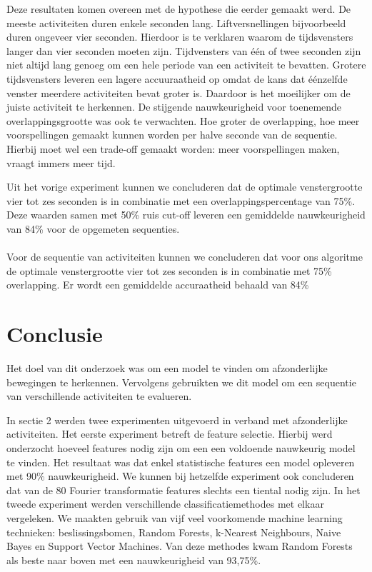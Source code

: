 \documentclass{article}
\begin{document}
Deze resultaten komen overeen met de hypothese die eerder gemaakt werd. De meeste activiteiten duren enkele seconden lang. Liftversnellingen bijvoorbeeld duren ongeveer vier seconden. Hierdoor is te verklaren waarom de tijdsvensters langer dan vier seconden moeten zijn. Tijdvensters van \'e\'en of twee seconden zijn niet altijd lang genoeg om een hele periode van een activiteit te bevatten. Grotere tijdsvensters leveren een lagere accuuraatheid op omdat de kans dat \'e\'enzelfde venster meerdere activiteiten bevat groter is. Daardoor is het moeilijker om de juiste activiteit te herkennen. De stijgende nauwkeurigheid voor toenemende overlappingsgrootte was ook te verwachten. Hoe groter de overlapping, hoe meer voorspellingen gemaakt kunnen worden per halve seconde van de sequentie. Hierbij moet wel een trade-off gemaakt worden: meer voorspellingen maken, vraagt immers meer tijd.

Uit het vorige experiment kunnen we concluderen dat de optimale venstergrootte vier tot zes seconden is in combinatie met een overlappingspercentage van 75\%. Deze waarden samen met 50\% ruis cut-off leveren een gemiddelde nauwkeurigheid van 84\% voor de opgemeten sequenties.
\\~\\
Voor de sequentie van activiteiten kunnen we concluderen dat voor ons algoritme de optimale venstergrootte vier tot zes seconden is in combinatie met 75\% overlapping. Er wordt een gemiddelde accuraatheid behaald van 84\%

	

\section{Conclusie}

Het doel van dit onderzoek was om een model te vinden om afzonderlijke bewegingen te herkennen. Vervolgens gebruikten we dit model om een sequentie van verschillende activiteiten te evalueren.

	In sectie 2 werden twee experimenten uitgevoerd in verband met afzonderlijke activiteiten. Het eerste experiment betreft de feature selectie. Hierbij werd onderzocht hoeveel features nodig zijn om een een voldoende nauwkeurig model te vinden. Het resultaat was dat enkel statistische features een model opleveren met 90\% nauwkeurigheid. We kunnen bij hetzelfde experiment ook concluderen dat van de 80 Fourier transformatie features slechts een tiental nodig zijn.
	In het tweede experiment werden verschillende classificatiemethodes met elkaar vergeleken. We maakten gebruik van vijf veel voorkomende machine learning technieken: beslissingsbomen, Random Forests, k-Nearest Neighbours, Naive Bayes en Support Vector Machines. Van deze methodes kwam Random Forests als beste naar boven met een nauwkeurigheid van 93,75\%.
	
\end{document}
